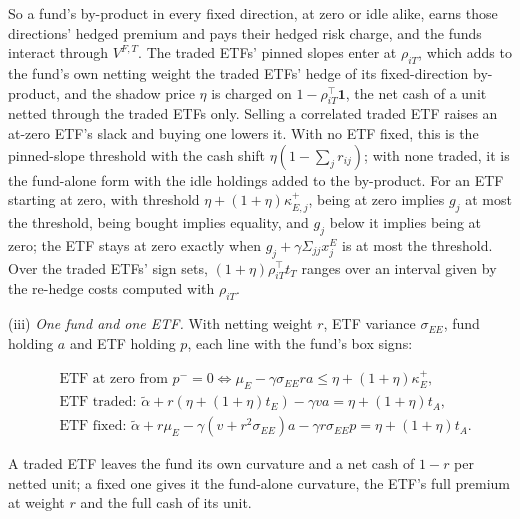 \documentclass[11pt]{article}
\begin{document}
So a fund's by-product in every fixed direction, at zero or idle
alike, earns those directions' hedged premium and pays their hedged
risk charge, and the funds interact through \(V^{F,T}\). The traded ETFs'
pinned slopes enter at \(\rho_{iT}\), which adds to the fund's own netting
weight the traded ETFs' hedge of its fixed-direction by-product, and
the shadow price \(\eta\) is charged on \(1-\rho_{iT}^\top\mathbf1\), the net cash of a unit
netted through the traded ETFs only. Selling a correlated traded ETF
raises an at-zero ETF's slack and buying one lowers it. With no ETF
fixed, this is the pinned-slope threshold with the cash shift
\(\eta(1-\sum_jr_{ij})\); with none traded, it is the fund-alone form with the
idle holdings added to the by-product. For an ETF starting at zero,
with threshold \(\eta+(1+\eta)\kappa^+_{E,j}\), being at zero implies \(g_j\) at most the
threshold, being bought implies equality, and \(g_j\) below it implies
being at zero; the ETF stays at zero exactly when \(g_j+\gamma\Sigma_{jj}x^E_j\) is at
most the threshold. Over the traded ETFs' sign sets,
\((1+\eta)\rho_{iT}^\top t_T\) ranges over an interval given by the re-hedge costs
computed with \(\rho_{iT}\).

(iii) \emph{One fund and one ETF.} With netting weight \(r\), ETF variance \(\sigma_{EE}\),
fund holding \(a\) and ETF holding \(p\), each line with the fund's box signs:

\begin{equation*}
\begin{aligned}
&\text{ETF at zero from }p^-=0\iff\mu_E-\gamma\sigma_{EE}ra\leq\eta+(1+\eta)\kappa^+_E,\\
&\text{ETF traded: }\tilde\alpha+r(\eta+(1+\eta)t_E)-\gamma va=\eta+(1+\eta)t_A,\\
&\text{ETF fixed: }\tilde\alpha+r\mu_E-\gamma(v+r^2\sigma_{EE})a-\gamma r\sigma_{EE}p=\eta+(1+\eta)t_A.
\end{aligned}\tag{136}\label{eq:136}
\end{equation*}

A traded ETF leaves the fund its own curvature and a net cash of \(1-r\)
per netted unit; a fixed one gives it the fund-alone curvature, the
ETF's full premium at weight \(r\) and the full cash of its unit.
\end{document}

